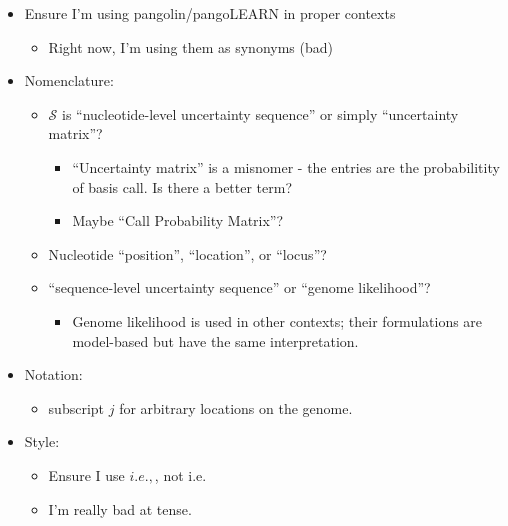 \documentclass[
]{article}
\providecommand{\tightlist}{%
  \setlength{\itemsep}{0pt}\setlength{\parskip}{0pt}}
\newcommand{\ie}{\textit{i.e.},\xspace}
\newcommand{\nps}{\mathcal{S}} %
\begin{document}
\begin{itemize}
\tightlist
\item
  Ensure I'm using pangolin/pangoLEARN in proper contexts

  \begin{itemize}
  \tightlist
  \item
    Right now, I'm using them as synonyms (bad)
  \end{itemize}
\item
  Nomenclature:

  \begin{itemize}
  \tightlist
  \item
    \(\nps\) is ``nucleotide-level uncertainty sequence'' or simply
    ``uncertainty matrix''?

    \begin{itemize}
    \tightlist
    \item
      ``Uncertainty matrix'' is a misnomer - the entries are the
      probabilitity of basis call. Is there a better term?
    \item
      Maybe ``Call Probability Matrix''?
    \end{itemize}
  \item
    Nucleotide ``position'', ``location'', or ``locus''?
  \item
    ``sequence-level uncertainty sequence'' or ``genome likelihood''?

    \begin{itemize}
    \tightlist
    \item
      Genome likelihood is used in other contexts; their formulations
      are model-based but have the same interpretation.
    \end{itemize}
  \end{itemize}
\item
  Notation:

  \begin{itemize}
  \tightlist
  \item
    subscript \(j\) for arbitrary locations on the genome.
  \end{itemize}
\item
  Style:

  \begin{itemize}
  \tightlist
  \item
    Ensure I use \(\ie\), not i.e.
  \item
    I'm really bad at tense.
  \end{itemize}
\end{itemize}
\end{document}
